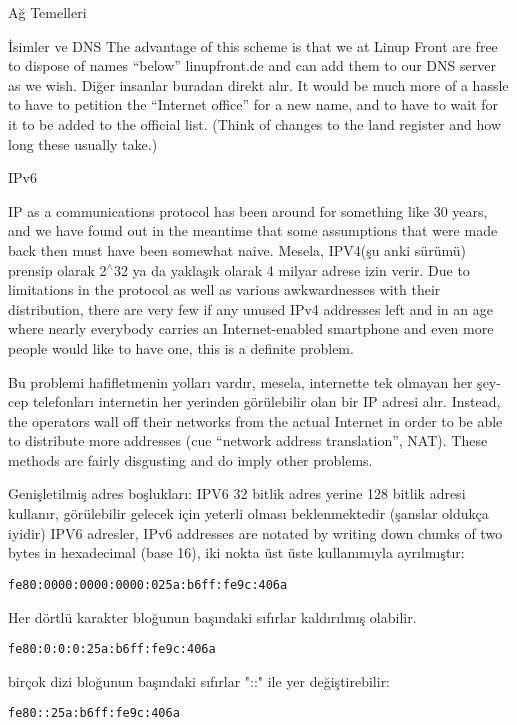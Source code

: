 \begin{section}{Ağ Temelleri}
\begin{subsection}{İsimler ve DNS}
The advantage of this scheme is that we at Linup Front are free to dispose of names “below” linupfront.de and can add them to our DNS server as we wish. Diğer insanlar buradan direkt alır.  It would be much more of a hassle to have to petition the “Internet office” for a new name, and to have to wait for it to be added to the official list. (Think of changes to the land register and how long these usually take.)

\end{subsection}
\begin{subsection}{IPv6}

IP as a communications protocol has been around for something like 30 years, and we have found out in the meantime that some assumptions that were made back then must have been somewhat naive. Mesela, IPV4(şu anki sürümü) prensip olarak 2$ ^\wedge $32 ya da yaklaşık olarak 4 milyar adrese izin verir. Due to limitations in the protocol as well as various awkwardnesses with their distribution, there are very few if any unused IPv4 addresses left and in an age where nearly everybody carries an Internet-enabled smartphone and even more people would like to have one, this is a definite problem.

Bu problemi hafifletmenin yolları vardır, mesela, internette tek olmayan her şey-cep telefonları  internetin her yerinden görülebilir olan bir IP adresi alır. Instead, the operators wall off their networks from the actual Internet in order to be able to distribute more addresses (cue “network address translation”, NAT). These methods are fairly disgusting and do imply other problems.

Genişletilmiş adres boşlukları: IPV6 32  bitlik adres yerine 128 bitlik adresi kullanır, görülebilir gelecek için yeterli olması beklenmektedir (şanslar oldukça iyidir) IPV6 adresler,  IPv6 addresses are notated by writing down chunks of two bytes in hexadecimal (base 16), iki nokta üst üste kullanımıyla ayrılmıştır:
\begin{verbatim}
fe80:0000:0000:0000:025a:b6ff:fe9c:406a
\end{verbatim}

Her dörtlü karakter bloğunun başındaki sıfırlar kaldırılmış olabilir.
\begin{verbatim}
fe80:0:0:0:25a:b6ff:fe9c:406a
\end{verbatim}
birçok dizi bloğunun başındaki sıfırlar "::" ile yer değiştirebilir:
\begin{verbatim}
fe80::25a:b6ff:fe9c:406a
\end{verbatim}


\end{subsection}
\end{section}
